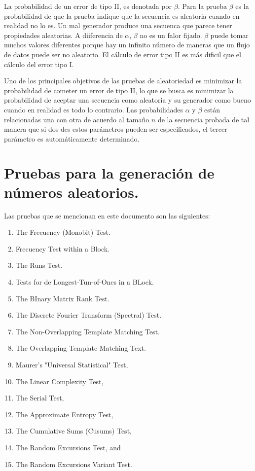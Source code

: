 \documentclass{llncs}
\theoremstyle{plane}
\begin{document}
La probabilidad de un error de tipo II, es denotada por $\beta$. Para la prueba $\beta$ es la probabilidad de que la prueba indique que la secuencia es aleatoria cuando en realidad no lo es. Un mal generador produce una secuenca que parece tener propiedades aleatorias.  A diiferencia de $\alpha$, $\beta$ no es un falor fijado. $\beta$ puede tomar muchos valores diferentes porque hay un infinito número de maneras que un flujo de datos puede ser no aleatorio. El cálculo de error tipo II es más dificil que el cálculo del error tipo I.

Uno de los principales objetivos de las pruebas de aleatoriedad es minimizar la probabilidad de cometer un error de tipo II, lo que se busca es minimizar la probabilidad de aceptar una secuencia como aleatoria y su generador como bueno cuando en realidad es todo lo contrario. Las probabilidades $\alpha$ y $\beta$ están relacionadas una con otra de acuerdo al tamaño $n$ de la secuencia probada de tal manera que si dos des estos parámetros pueden ser especificados,  el tercer parámetro es automáticamente determinado.



\section{Pruebas para la generación de números aleatorios.}
Las pruebas que se mencionan en este documento son las siguientes:
\begin{enumerate}
\item The Frecuency (Monobit) Test.
\item Frecuency Test within a Block.
\item The Runs Test.
\item Tests for de Longest-Tun-of-Ones in a BLock.
\item The BInary Matrix Rank Test.
\item The Discrete Fourier Transform (Spectral) Test.
\item The Non-Overlapping Template Matching Test.
\item The Overlapping Template Matching Text.
\item Maurer's "Universal Statistical" Test,
\item The Linear Complexity Test,
\item The Serial Test,
\item The Approximate Entropy Test,
\item The Cumulative Sums (Cusums) Test,
\item The Random Excursions Test, and
\item The Random Excursions Variant Test.

\end{enumerate}
\end{document}
